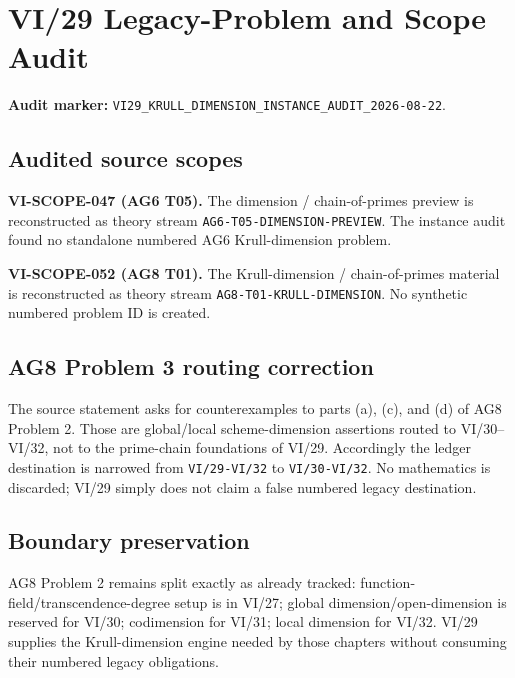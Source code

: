 \chapter*{VI/29 Legacy-Problem and Scope Audit}
\label{audit:vi29}

\textbf{Audit marker:} \texttt{VI29\_KRULL\_DIMENSION\_INSTANCE\_AUDIT\_2026-08-22}.

\section*{Audited source scopes}
\textbf{VI-SCOPE-047 (AG6 T05).}
The dimension / chain-of-primes preview is reconstructed as theory stream
\texttt{AG6-T05-DIMENSION-PREVIEW}.  The instance audit found no standalone numbered AG6 Krull-dimension problem.

\textbf{VI-SCOPE-052 (AG8 T01).}
The Krull-dimension / chain-of-primes material is reconstructed as theory stream
\texttt{AG8-T01-KRULL-DIMENSION}.  No synthetic numbered problem ID is created.

\section*{AG8 Problem 3 routing correction}
The source statement asks for counterexamples to parts (a), (c), and (d) of AG8 Problem 2.  Those are global/local
scheme-dimension assertions routed to VI/30--VI/32, not to the prime-chain foundations of VI/29.  Accordingly the
ledger destination is narrowed from \texttt{VI/29-VI/32} to \texttt{VI/30-VI/32}.  No mathematics is discarded;
VI/29 simply does not claim a false numbered legacy destination.

\section*{Boundary preservation}
AG8 Problem 2 remains split exactly as already tracked: function-field/transcendence-degree setup is in VI/27;
global dimension/open-dimension is reserved for VI/30; codimension for VI/31; local dimension for VI/32.  VI/29
supplies the Krull-dimension engine needed by those chapters without consuming their numbered legacy obligations.
